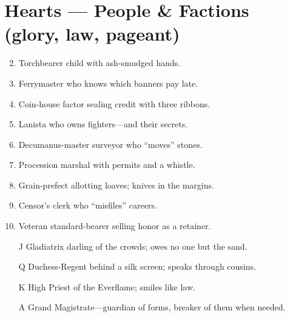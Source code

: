 \section*{Hearts --- People \& Factions (glory, law, pageant)}
\begin{enumerate}
\setcounter{enumi}{1}
\item Torchbearer child with ash-smudged hands.
\item Ferrymaster who knows which banners pay late.
\item Coin-house factor sealing credit with three ribbons.
\item Lanista who owns fighters---and their secrets.
\item Decumanus-master surveyor who ``moves'' stones.
\item Procession marshal with permits and a whistle.
\item Grain-prefect allotting loaves; knives in the margins.
\item Censor's clerk who ``misfiles'' careers.
\item Veteran standard-bearer selling honor as a retainer.
\item[J] Gladiatrix darling of the crowds; owes no one but the sand.
\item[Q] Duchess-Regent behind a silk screen; speaks through cousins.
\item[K] High Priest of the Everflame; smiles like law.
\item[A] Grand Magistrate---guardian of forms, breaker of them when needed.
\end{enumerate}

